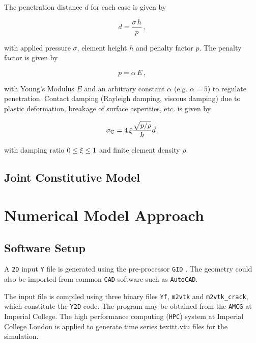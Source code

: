 \documentclass[format=acmtog,12pt,screen=true,review=false,natbib=false,]{acmart}
\begin{document}
\bigbreak
The penetration distance $d$ for each case is given by \cite{Mun04}

\begin{equation}
    \label{eq:d}
    d=\frac{\sigma\,h}{p}\,,
\end{equation}

with applied pressure $\sigma$, element height $h$ and penalty factor $p$. The penalty factor is given by

\begin{equation}
    \label{eq:p}
    p=\alpha\,E\,,
\end{equation}

with \rm{Young's Modulus} $E$ and an arbitrary constant $\alpha$ (e.g. $\alpha=5$) to regulate penetration. Contact damping (Rayleigh damping, viscous damping) due to plastic deformation, breakage of surface asperities, etc. is given by \cite{Mun04}

\begin{equation}
    \label{eq:sigmac}
    \sigma_{\rm{C}}=4\,\xi\frac{\sqrt{p/\rho}}{h}\dot{d}\,,
\end{equation}

\addtocounter{footnote}{-1}
with damping ratio $0\leq\xi\leq1$ and finite element density $\rho$.  


\subsection{Joint Constitutive Model}

\section{Numerical Model Approach}
\label{sec:NumericalModelApproach}

\subsection{Software Setup}
\label{subsec:SoftwareSetup}

A \texttt{2D} input \texttt{Y} file is generated using the pre-processor \texttt{GID} \cite{GID11}. The geometry could also be imported from common \texttt{CAD} software such as \texttt{AutoCAD}.

\bigbreak
The input file is compiled using three binary files \texttt{Yf}, \texttt{m2vtk} and \texttt{m2vtk\_crack}, which constitute the \texttt{Y2D} code. The program may be obtained from the \texttt{AMCG} at Imperial College. The high performance computing (\texttt{HPC}) system at Imperial College London is applied to generate time series texttt{.vtu} files for the simulation. 
\end{document}
